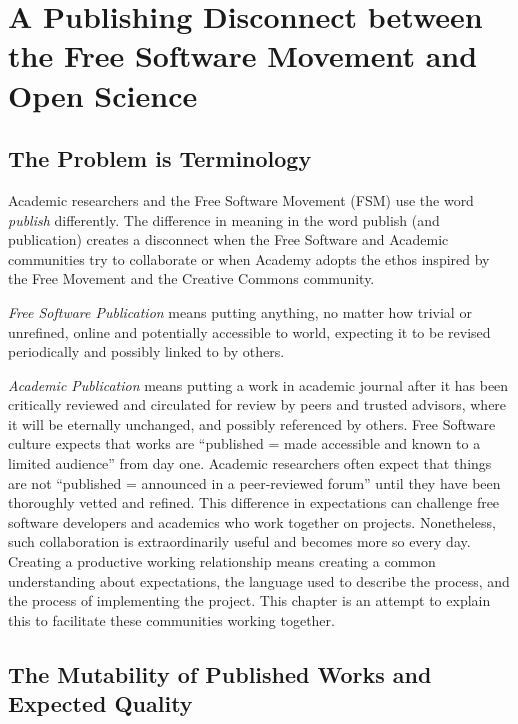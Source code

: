 \documentclass[
	fontsize=10pt, %
	twoside=false, %
	secnumdepth=1, %
]{kaobook}
\begin{document}
\chapter{A Publishing Disconnect between the Free Software Movement and Open Science}
\label{chap:publishdisconnect}

\section{The Problem is Terminology}
Academic researchers and the Free Software Movement (FSM) use the word
{\em publish} differently.  The difference in meaning in the word publish
(and publication) creates a disconnect when the Free Software and
Academic communities try to collaborate or when Academy adopts the
ethos inspired by the Free Movement and the Creative Commons
community.

{\em Free Software Publication} means putting
anything, no matter how trivial or unrefined, online and potentially
accessible to world, expecting it to be revised periodically and
possibly linked to by others.

{\em Academic Publication} means putting a
work in academic journal after it has been critically reviewed and
circulated for review by peers and trusted advisors, where it will be
eternally unchanged, and possibly referenced by others.  Free Software
culture expects that works are “published = made accessible and known
to a limited audience” from day one. Academic researchers often expect
that things are not “published = announced in a peer-reviewed forum”
until they have been thoroughly vetted and refined. This difference in
expectations can challenge free software developers and academics who
work together on projects. Nonetheless, such collaboration is
extraordinarily useful and becomes more so every day. Creating a
productive working relationship means creating a common understanding
about expectations, the language used to describe the process, and the
process of implementing the project.  This chapter is an attempt to
explain this to facilitate these communities working together.

\section{The Mutability of Published Works and Expected Quality}
\end{document}
